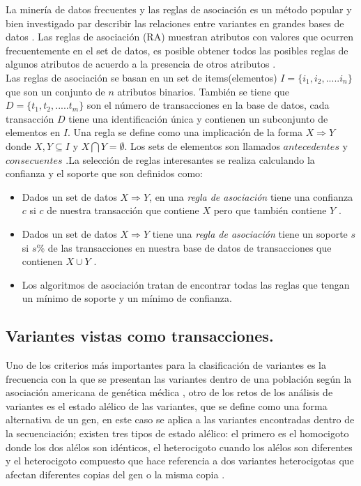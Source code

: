 La minería de datos frecuentes y las reglas de asociación  es un método popular y bien investigado par describir las relaciones entre variantes en grandes bases de datos \cite{Hahsler2005}. Las reglas de asociación (RA) muestran atributos con valores que ocurren frecuentemente en el set de datos, es posible obtener todos las posibles reglas de algunos atributos de acuerdo a la presencia de otros atributos \cite{Karabatak2009}.\\

Las reglas de asociación se basan en un set de items(elementos) $I = \{i_1,i_2,.....i_n \}$ que son un conjunto de $n$ atributos binarios. También se tiene que $D = \{t_1,t_2,..... t_m\}$ son el número de transacciones en la base de datos, cada transacción $D$ tiene una identificación única y contienen un subconjunto de elementos en $I$. Una regla se define como una implicación de la forma $X \Rightarrow Y$ donde $X,Y \subseteq I$ y $X \bigcap Y = \emptyset$. Los sets de elementos son llamados $antecedentes$ y $consecuentes$ \cite{Hahsler2005,Karabatak2009}.La selección de reglas interesantes se realiza calculando la confianza y el soporte que son definidos como:

\begin{itemize}
	\item Dados un set de datos $X \Rightarrow Y$, en una \textit{regla de asociación} tiene una confianza $c$ si $c$ de nuestra transacción que contiene $X$ pero que también contiene $Y$ \cite{Agrawal1994}.
	
	\item Dados un set de datos $X \Rightarrow Y$ tiene una \textit{regla de asociación} tiene un soporte $s$ si $s\%$ de las transacciones en nuestra base de datos de transacciones que contienen $X\cup Y$ \cite{Agrawal1994}. 
	
	\item Los algoritmos de asociación tratan de encontrar todas las reglas que tengan un mínimo de soporte y un mínimo de confianza\cite{Agrawal1994}. 

\end{itemize}

\subsection{Variantes vistas como transacciones.}

Uno de los criterios más importantes para la clasificación de variantes es la frecuencia con la que se presentan las variantes dentro de una población según la asociación americana de genética médica \cite{Laboratories2015}, otro de los retos de los análisis de variantes es el estado alélico de las variantes, que se define como una forma alternativa de un gen, en este caso se aplica a las variantes encontradas dentro de la secuenciación; existen tres tipos de estado alélico: el primero es el homocigoto donde los dos alélos son idénticos, el heterocigoto cuando los alélos son diferentes y el heterocigoto compuesto que hace referencia a dos variantes heterocigotas que afectan diferentes copias del gen o la misma copia \cite{Klug2013,Compound2012}.\\

